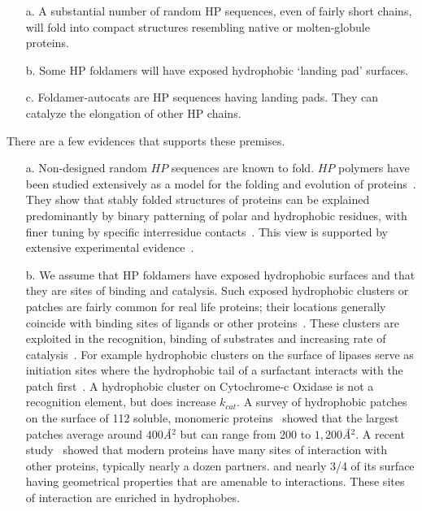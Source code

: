 \documentclass[5p,times]{elsarticle}
\begin{document}
 \begin{itemize}
 \item [a.] A substantial number of random HP sequences, even of fairly short chains, will fold 
into compact structures resembling native or molten-globule proteins.
 \item [b.] Some HP foldamers will have exposed hydrophobic `landing pad' surfaces.
 \item [c.] Foldamer-autocats are HP sequences having landing pads. They can catalyze the 
elongation of other HP chains.
\end{itemize}

There are a few evidences that supports these premises.
\begin{itemize}
\item [a.] Non-designed random $HP$ sequences 
are known to fold.  $HP$ polymers have been studied extensively as a model for the folding and 
evolution of proteins~\cite{lau1989lattice,Chan1991,Miller1995,Yue1995,agarwala1997local}.  They 
show that stably folded structures of proteins can be explained predominantly by binary patterning 
of polar and hydrophobic residues, with finer tuning by specific interresidue 
contacts~\cite{Yue1992,Xiong1995}.  This view is supported by extensive experimental 
evidence~\cite{Lim1991,Kamtekar1993,Wei2003,Brisendine2015}. 

\item [b.]
We assume that HP foldamers have exposed hydrophobic surfaces and that they are sites of binding 
and catalysis. Such exposed hydrophobic clusters or patches are fairly common for 
real life proteins; their locations generally coincide with binding sites of ligands or other 
proteins~\cite{Lijnzaad1996}. These clusters are exploited in the recognition, binding of 
substrates and 
increasing rate of catalysis~\cite{MitchellGuss1983,Lijnzaad1996,VanEe1997,Witt1998}. For example 
hydrophobic clusters on the surface of lipases serve as initiation sites where the hydrophobic 
tail of a surfactant interacts with the patch first~\cite{VanEe1997}. A hydrophobic 
cluster on Cytochrome-c 
Oxidase is not a recognition element, but does increase $k_{cat}$\cite{Witt1998}. A survey of 
hydrophobic patches on the surface of 112 soluble, monomeric proteins~\cite{Lijnzaad1996} showed 
that the largest patches average around $400$\textit{\AA}$^2$ but can range from $200$ to 
$1,200$\textit{\AA}$^2$. A recent study~\cite{Tonddast-Navaei2015} showed that modern proteins have 
many sites of interaction with other proteins, typically nearly a dozen partners.  and nearly 3/4 
of 
its surface having geometrical properties that are amenable to interactions. These sites of 
interaction are enriched in hydrophobes.


\end{itemize}
\end{document}
